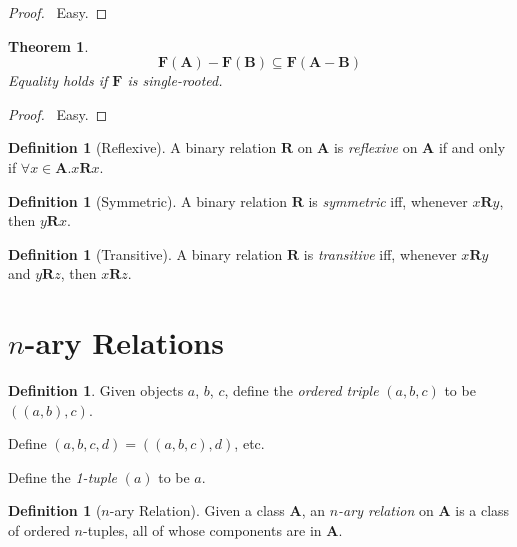 \documentclass{article}
\let\qed\relax
\newtheorem{theorem}[axiom]{Theorem}
\theoremstyle{definition}
\newtheorem{definition}[axiom]{Definition}
\begin{document}
    \begin{proof}
        \pf\ Easy. \qed
    \end{proof}

    \begin{theorem}
        \[ \mathbf{F}(\mathbf{A}) - \mathbf{F}(\mathbf{B}) \subseteq \mathbf{F}(\mathbf{A} - \mathbf{B}) \]
        Equality holds if $\mathbf{F}$ is single-rooted.
    \end{theorem}

    \begin{proof}
        \pf\ Easy. \qed
    \end{proof}

    \begin{definition}[Reflexive]
        A binary relation $\mathbf{R}$ on $\mathbf{A}$ is \emph{reflexive} on $\mathbf{A}$ if and only if
        $\forall x \in \mathbf{A}. x\mathbf{R}x$.
    \end{definition}

    \begin{definition}[Symmetric]
        A binary relation $\mathbf{R}$ is \emph{symmetric} iff, whenever $x\mathbf{R}y$, then $y\mathbf{R}x$.
    \end{definition}

    \begin{definition}[Transitive]
        A binary relation $\mathbf{R}$ is \emph{transitive} iff, whenever $x\mathbf{R}y$ and $y\mathbf{R}z$,
        then $x\mathbf{R}z$.
    \end{definition}

    \section{$n$-ary Relations}

    \begin{definition}
        Given objects $a$, $b$, $c$, define the \emph{ordered triple}
        $(a,b,c)$ to be $((a,b),c)$.

        Define $(a,b,c,d) = ((a,b,c),d)$, etc.

        Define the \emph{1-tuple} $(a)$ to be $a$.
    \end{definition}

    \begin{definition}[$n$-ary Relation]
        Given a class $\mathbf{A}$, an \emph{$n$-ary relation} on $\mathbf{A}$ is a class of ordered
        $n$-tuples, all of whose components are in $\mathbf{A}$.
    \end{definition}
\end{document}
